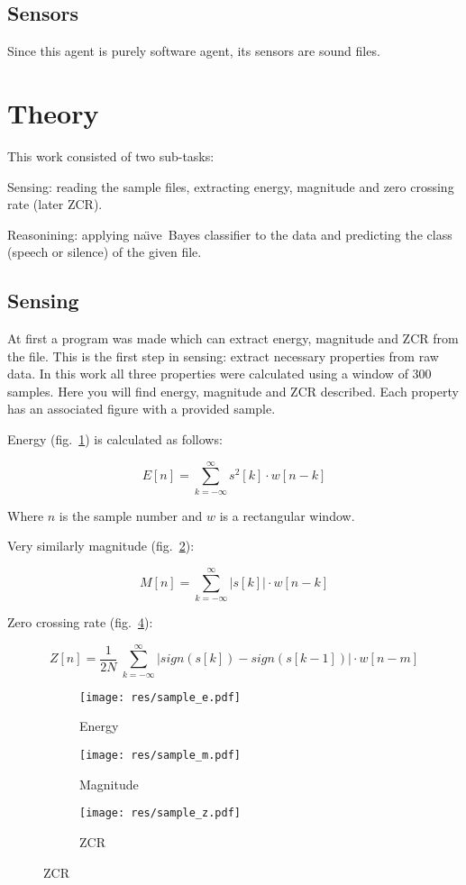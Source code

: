 \documentclass[english,11pt]{article}
\newcommand{\naive}{na\"{\i}ve\ }
\begin{document}
\subsection{Sensors}
Since this agent is purely software agent, its sensors are sound files.


\section{Theory}

This work consisted of two sub-tasks:
\begin{description}
    \item{Sensing:} reading the sample files, extracting energy, magnitude and
        zero crossing rate (later ZCR).

    \item{Reasonining:} applying \naive Bayes classifier to the data and
        predicting the class (speech or silence) of the given file.
\end{description}

\subsection{Sensing}

At first a program was made which can extract energy, magnitude and ZCR from
the file. This is the first step in sensing: extract necessary properties from
raw data. In this work all three properties were calculated using a window of
300 samples. Here you will find energy, magnitude and ZCR described. Each
property has an associated figure with a provided sample.

Energy (fig.~\ref{fig:sample_e}) is calculated as follows:

$$ E[n] = \sum_{k=-\infty}^{\infty} s^2[k] \cdot w[n-k] $$

Where $n$ is the sample number and $w$ is a rectangular window.

Very similarly magnitude (fig.~\ref{fig:sample_m}):

$$ M[n] = \sum_{k=-\infty}^{\infty} |s[k]| \cdot w[n-k] $$

Zero crossing rate (fig.~\ref{fig:sample_z}):

$$
    Z[n] = \frac{1}{2N} \
        \sum_{k=-\infty}^{\infty}
        |sign(s[k]) - sign(s[k-1])| \cdot w[n-m]
$$

\begin{figure}
    \centering
    \begin{subfigure}[b]{0.5\textwidth}
        \texttt{[image: res/sample\_e.pdf]}
        \caption{Energy}
        \label{fig:sample_e}
    \end{subfigure}%
    \begin{subfigure}[b]{0.5\textwidth}
        \texttt{[image: res/sample\_m.pdf]}
        \caption{Magnitude}
        \label{fig:sample_m}
    \end{subfigure}

    \begin{subfigure}[b]{\textwidth}
        \texttt{[image: res/sample\_z.pdf]}
        \caption{ZCR}
        \label{fig:sample_z}
    \end{subfigure}
\end{figure}
\end{document}
